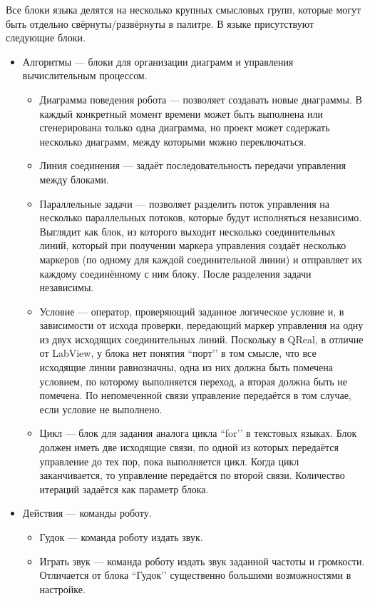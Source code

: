 \documentclass[a4paper]{article}
\begin{document}
Все блоки языка делятся на несколько крупных смысловых групп, которые могут быть отдельно свёрнуты/развёрнуты в палитре. В языке присутствуют следующие блоки.
\begin{itemize}
	\item Алгоритмы --- блоки для организации диаграмм и управления вычислительным процессом.
  \begin{itemize}
    \item Диаграмма поведения робота --- позволяет создавать новые диаграммы. В каждый конкретный момент времени может быть выполнена или сгенерирована только одна диаграмма, но проект может содержать несколько диаграмм, между которыми можно переключаться.
    \item Линия соединения --- задаёт последовательность передачи управления между блоками.
    \item Параллельные задачи --- позволяет разделить поток управления на несколько параллельных потоков, которые будут исполняться независимо. Выглядит как блок, из которого выходит несколько соединительных линий, который при получении маркера управления создаёт несколько маркеров (по одному для каждой соединительной линии) и отправляет их каждому соединённому с ним блоку. После разделения задачи независимы.
    \item Условие --- оператор, проверяющий заданное логическое условие и, в зависимости от исхода проверки, передающий маркер управления на одну из двух исходящих соединительных линий. Поскольку в QReal, в отличие от LabView, у блока нет понятия ``порт’’ в том смысле, что все исходящие линии равнозначны, одна из них должна быть помечена условием, по которому выполняется переход, а вторая должна быть не помечена. По непомеченной связи управление передаётся в том случае, если условие не выполнено.
    \item Цикл --- блок для задания аналога цикла ``for’’ в текстовых языках. Блок должен иметь две исходящие связи, по одной из которых передаётся управление до тех пор, пока выполняется цикл. Когда цикл заканчивается, то управление передаётся по второй связи. Количество итераций задаётся как параметр блока.
  \end{itemize}
  \item Действия --- команды роботу.
  \begin{itemize}
    \item Гудок --- команда роботу издать звук.
    \item Играть звук --- команда роботу издать звук заданной частоты и громкости. Отличается от блока ``Гудок’’ существенно большими возможностями в настройке.

\end{itemize}
\end{itemize}
\end{document}
